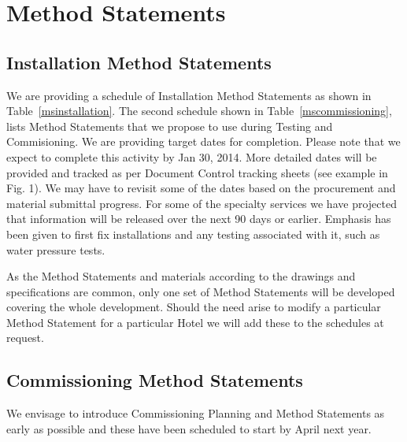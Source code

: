\documentclass[a4paper, justified]{tufte-book}
\newcounter{tsection}
\newcounter{ms}[tsection]
\begin{document}
\chapter{Method Statements}

\section*{Installation Method Statements}

We are providing a schedule of Installation Method Statements as shown in Table~\ref{msinstallation}. The second schedule shown in Table~\ref{mscommissioning}, lists Method Statements that we propose to use during Testing and Commisioning. We are providing target dates for completion. Please note that we expect to complete this activity by Jan 30, 2014. More detailed dates will be provided and tracked as per Document Control tracking sheets (see example in Fig. 1).  We may have to revisit some of the dates based on the procurement and material submittal progress. For some of the specialty services we have projected that information will be released over the next 90 days or earlier.  Emphasis has been given to first fix installations and any testing associated with it, such as water pressure tests. 

As the Method Statements and materials according to the drawings and specifications are common, only one set of Method Statements will be developed covering the whole development. Should the need arise to modify a particular Method Statement for a particular Hotel we will add these to the schedules at request.

\section*{Commissioning Method Statements}

We envisage to introduce Commissioning Planning and Method Statements as early as possible and these have been scheduled to start by April next year. 

\clearpage
\end{document}
